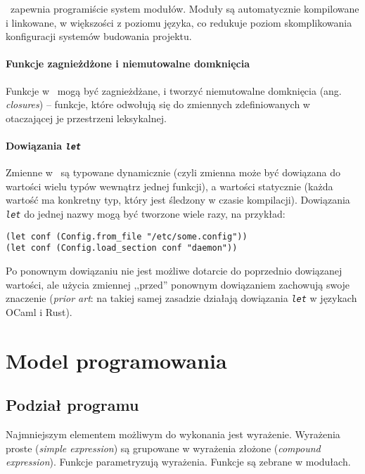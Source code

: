 \ViuAct\ zapewnia programiście system modułów. Moduły są automatycznie kompilowane i linkowane, w większości z
poziomu języka, co redukuje poziom skomplikowania konfiguracji systemów budowania projektu.

\paragraph*{Funkcje zagnieżdżone i niemutowalne domknięcia}

Funkcje w \ViuAct\ mogą być zagnieżdżane, i tworzyć niemutowalne domknięcia (ang. \emph{closures}) -- funkcje,
które odwołują się do zmiennych zdefiniowanych w otaczającej je przestrzeni leksykalnej.

\paragraph*{Dowiązania \emph{\texttt{let}}}

Zmienne w \ViuAct\ są typowane dynamicznie (czyli zmienna może być dowiązana do wartości wielu typów wewnątrz
jednej funkcji), a wartości statycznie (każda wartość ma konkretny typ, który jest śledzony w czasie
kompilacji). Dowiązania \emph{\texttt{let}} do jednej nazwy mogą być tworzone wiele razy, na przykład:

\begin{lstlisting}
(let conf (Config.from_file "/etc/some.config"))
(let conf (Config.load_section conf "daemon"))
\end{lstlisting}

Po ponownym dowiązaniu nie jest możliwe dotarcie do poprzednio dowiązanej wartości, ale użycia zmiennej
,,przed'' ponownym dowiązaniem zachowują swoje znaczenie (\emph{prior art}: na takiej samej zasadzie działają
dowiązania \emph{\texttt{let}} w językach OCaml i Rust).

\section{Model programowania}
\label{specyfikacja_jezyka_viuact_model_programowania}

\subsection{Podział programu}

Najmniejszym elementem możliwym do wykonania jest wyrażenie.
Wyrażenia proste (\emph{simple expression}) są grupowane w wyrażenia złożone (\emph{compound expression}).
Funkcje parametryzują wyrażenia.
Funkcje są zebrane w modułach.

